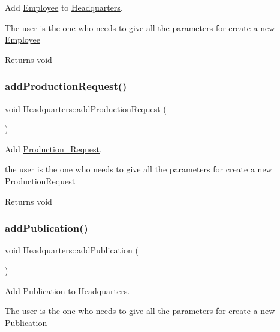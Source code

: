 Add \hyperlink{class_employee}{Employee} to \hyperlink{class_headquarters}{Headquarters}. 

The user is the one who needs to give all the parameters for create a new \hyperlink{class_employee}{Employee}

\begin{DoxyReturn}{Returns}
void 
\end{DoxyReturn}
\mbox{\label{class_headquarters_acc151cbc13eaee84fdd6ac8d2bdf83bb}} 
\subsubsection{\texorpdfstring{add\+Production\+Request()}{addProductionRequest()}}
{\footnotesize\ttfamily void Headquarters\+::add\+Production\+Request (\begin{DoxyParamCaption}{ }\end{DoxyParamCaption})}



Add \hyperlink{class_production___request}{Production\+\_\+\+Request}. 

the user is the one who needs to give all the parameters for create a new Production\+Request

\begin{DoxyReturn}{Returns}
void 
\end{DoxyReturn}
\mbox{\label{class_headquarters_ad232157623c9d2ada742982f08a82be8}} 
\subsubsection{\texorpdfstring{add\+Publication()}{addPublication()}}
{\footnotesize\ttfamily void Headquarters\+::add\+Publication (\begin{DoxyParamCaption}{ }\end{DoxyParamCaption})}



Add \hyperlink{class_publication}{Publication} to \hyperlink{class_headquarters}{Headquarters}. 

The user is the one who needs to give all the parameters for create a new \hyperlink{class_publication}{Publication}


